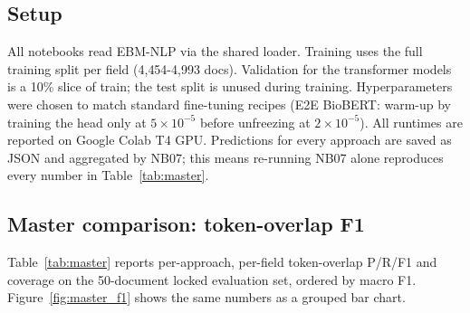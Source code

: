 \documentclass[11pt]{article}
\begin{document}
\subsection{Setup}

All notebooks read EBM-NLP via the shared loader. Training uses the full
training split per field (4{,}454-4{,}993 docs). Validation for the
transformer models is a 10\% slice of train; the test split is unused
during training. Hyperparameters were chosen to match standard
fine-tuning recipes (E2E BioBERT: warm-up by training the head only at
$5\!\times\!10^{-5}$ before unfreezing at $2\!\times\!10^{-5}$). All
runtimes are reported on Google Colab T4 GPU. Predictions for every
approach are saved as JSON and aggregated by NB07; this means re-running
NB07 alone reproduces every number in Table~\ref{tab:master}.

\subsection{Master comparison: token-overlap F1}
\label{sec:master_comparison}

Table~\ref{tab:master} reports per-approach, per-field token-overlap
P/R/F1 and coverage on the 50-document locked evaluation set, ordered
by macro F1. Figure~\ref{fig:master_f1} shows the same numbers as a
grouped bar chart.
\end{document}
